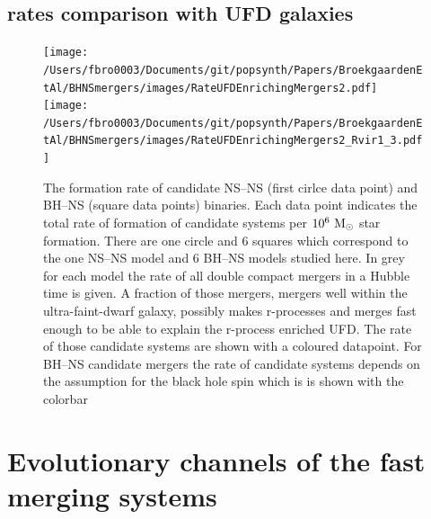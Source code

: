 \documentclass[a4paper,fleqn,usenatbib,useAMS,usedcolumn]{mnras}
\begin{document}
%
\subsection{rates comparison with UFD galaxies}
%
\begin{figure}
		\texttt{[image: /Users/fbro0003/Documents/git/popsynth/Papers/BroekgaardenEtAl/BHNSmergers/images/RateUFDEnrichingMergers2.pdf]}
		\texttt{[image: /Users/fbro0003/Documents/git/popsynth/Papers/BroekgaardenEtAl/BHNSmergers/images/RateUFDEnrichingMergers2\_Rvir1\_3.pdf]}
    \caption{ The formation rate of candidate  NS--NS (first cirlce data point) and BH--NS (square data points) binaries. Each data point indicates the total rate of formation of candidate systems per $10^6 \ \rm{M}_{\odot}$ star formation. There are one circle and 6 squares which correspond to the one NS--NS model and 6 BH--NS models studied here. In grey for each model the rate of all double compact mergers in a Hubble time is given. A fraction of those mergers, mergers well within the ultra-faint-dwarf galaxy, possibly makes r-processes  and merges fast enough to be able to explain the r-process enriched UFD. The rate of those candidate systems are shown with a coloured datapoint. For BH--NS candidate mergers the rate of candidate systems depends on the assumption for the black hole spin which is is shown with the colorbar} 
    \label{fig:RateCandidateEnriching}
\end{figure}





\section{Evolutionary channels of the fast merging systems}
\label{sec:evolutionchannels}
\end{document}
